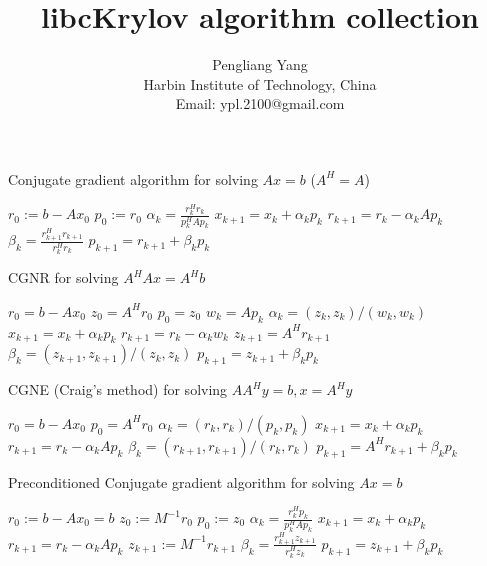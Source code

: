 \documentclass[10pt]{article}
\title{libcKrylov algorithm collection}
\author{Pengliang Yang\\
  Harbin Institute of Technology, China\\
Email: ypl.2100@gmail.com}
\begin{document}
\maketitle


\begin{algorithm}[H]
  \caption{Conjugate gradient algorithm for solving $Ax=b$ ($A^H=A$) \citep{Shewchuk_1994_ICG}}\label{alg:CG}
  \begin{algorithmic}[1]
  \State $r_0:=b-A x_0$
  \State $p_0:=r_0$
    \State $\alpha_k=\frac{r_k^H r_k}{p_k^H Ap_k}$
    \State $x_{k+1}=x_k + \alpha_k p_k$
    \State $r_{k+1}=r_k - \alpha_k A p_k$
    \State $\beta_{k} = \frac{r_{k+1}^H r_{k+1}}{r_k^H r_k}$\;
    \State $p_{k+1}=r_{k+1} + \beta_k p_k$\;
    \EndFor
  \end{algorithmic}
\end{algorithm}

\begin{algorithm}[H]
  \caption{CGNR for solving $A^H Ax=A^H b$ \citep[algorithm 8.4]{Saad_2003_IMS}}
  \begin{algorithmic}[1]
    \State $r_0=b-Ax_0$
    \State $z_0 = A^H r_0$
    \State $p_0=z_0$
    \State $w_k=Ap_k$
    \State $\alpha_k = (z_k,z_k)/(w_k,w_k)$
    \State $x_{k+1} = x_k + \alpha_k  p_k$
    \State $r_{k+1} = r_k-\alpha_k w_k$
    \State $z_{k+1}=A^H r_{k+1}$
    \State $\beta_k = (z_{k+1},z_{k+1})/(z_k,z_k)$
    \State $p_{k+1}=z_{k+1}+\beta_k p_k$
    \EndFor
  \end{algorithmic}
\end{algorithm}

\begin{algorithm}[H]
  \caption{CGNE (Craig's method) for solving $AA^H y=b, x=A^H y$\citep[algorithm 8.5]{Saad_2003_IMS}}
  \begin{algorithmic}[1]
    \State $r_0=b-Ax_0$
    \State $p_0 = A^H r_0$
    \State $\alpha_k = (r_k , r_k)/(p_k, p_k )$
    \State $x_{k+1} = x_k + \alpha_k  p_k$
    \State $r_{k+1} = r_k-\alpha_k Ap_k$
    \State $\beta_k = (r_{k+1},r_{k+1})/(r_k,r_k)$
    \State $p_{k+1}=A^H r_{k+1}+\beta_k p_k$
    \EndFor
  \end{algorithmic}
\end{algorithm}

\begin{algorithm}[H]
  \caption{Preconditioned Conjugate gradient algorithm for solving $Ax=b$ \citep[algorithm 9.1]{Saad_2003_IMS}}
  \begin{algorithmic}[1]
  \State $r_0:=b-A x_0=b$
  \State $z_0:=M^{-1}r_0$
  \State $p_0:=z_0$
    \State $\alpha_k=\frac{r_k^H p_k}{p_k^H Ap_k}$
    \State $x_{k+1}=x_k + \alpha_k p_k$
    \State $r_{k+1}=r_k - \alpha_k A p_k$
    \State $z_{k+1}:=M^{-1}r_{k+1}$
    \State $\beta_{k} = \frac{r_{k+1}^H z_{k+1}}{r_k^H z_k}$\;
    \State $p_{k+1}=z_{k+1} + \beta_k p_k$\;
    \EndFor
  \end{algorithmic}
\end{algorithm}
\end{document}
